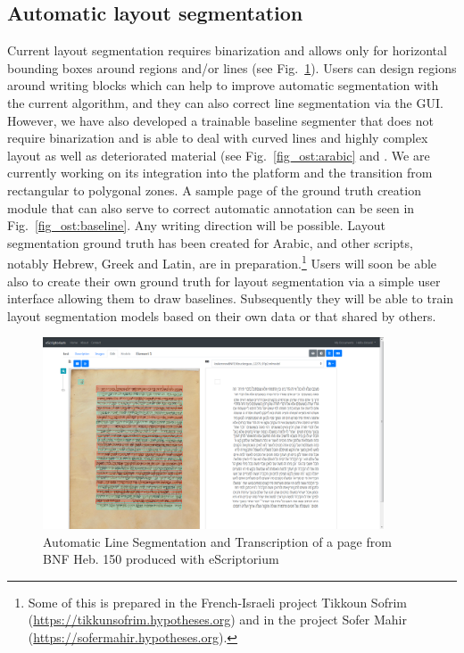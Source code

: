 \subsection{Automatic layout segmentation}

Current layout segmentation requires binarization and allows only for
horizontal bounding boxes around regions and/or lines (see Fig.~\ref{fig_ost:automatic}). Users can
design regions around writing blocks which can help to improve automatic
segmentation with the current algorithm, and they can also correct line
segmentation via the GUI. However, we have also developed a trainable baseline
segmenter that does not require binarization and is able to deal with curved
lines and highly complex layout as well as deteriorated material (see Fig.~\ref{fig_ost:arabic}
and \cite{kiessling2019badam}. We are currently working on its integration into
the platform and the transition from rectangular to polygonal zones. A sample
page of the ground truth creation module that can also serve to correct
automatic annotation can
be seen in Fig.~\ref{fig_ost:baseline}. Any writing direction will be possible. Layout segmentation
ground truth has been created for Arabic\cite{kiessling2019badam}, and other scripts, notably
Hebrew, Greek and Latin, are in preparation.\footnote{Some of this is prepared
in the French-Israeli project Tikkoun Sofrim
(\url{https://tikkunsofrim.hypotheses.org})
\cite{kuflik2019tikkoun,wecker2019tikkoun} and in the project Sofer Mahir
(\url{https://sofermahir.hypotheses.org}).} Users will soon be able also to
create their own ground truth for layout segmentation via a simple user
interface allowing them to draw baselines. Subsequently they will be able to
train layout segmentation models based on their own data or that shared by
others.

\begin{figure}
	\centering
	\includegraphics[width=0.9\textwidth]{automatic_transcription_BNF_heb_150.png}
	\caption{Automatic Line Segmentation and Transcription of a page from BNF Heb. 150 produced with eScriptorium}
	\label{fig_ost:automatic}
\end{figure}

